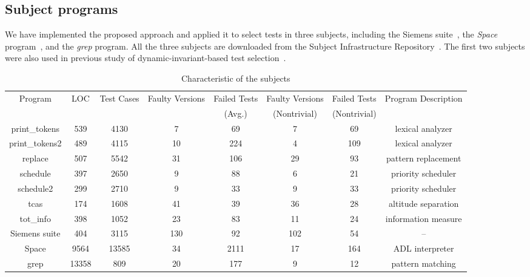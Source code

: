 \documentclass{sig-alternate}
\begin{document}
\subsection{Subject programs}

We have implemented the proposed approach and applied it to select
tests in three subjects, including the Siemens
suite~\cite{Hutchins94}, the {\it Space} program~\cite{Rothermel01},
and the {\it grep} program. All the three subjects are downloaded
from the Subject Infrastructure Repository~\cite{SIR}. The first two
subjects were also used in previous study of dynamic-invariant-based
test selection~\cite{Harder03}.



\begin{table}[t]
\caption{Characteristic of the subjects}\label{tab:subjects} \center
\begin{tabular}{|c|c|c|c|c|c|c|c|}
%

\hline  Program &   LOC &   Test Cases  &   Faulty Versions & Failed
Tests & Faulty Versions     &   Failed Tests
    &   Program Description \\
 & &  &  & (Avg.) & (Nontrivial) & (Nontrivial) & \\

\hline  print\_tokens   &   539 &   4130    &   7   &   69    &   7   &   69    &   lexical analyzer    \\
\hline  print\_tokens2  &   489 &   4115    &   10  &   224   &   4   &   109   &   lexical analyzer    \\
\hline  replace &   507 &   5542    &   31  &   106   &   29  &   93    &   pattern replacement \\
\hline  schedule    &   397 &   2650    &   9   &   88    &   6   &   21  &   priority scheduler  \\
\hline  schedule2   &   299 &   2710    &   9   &   33    &   9   &   33    &   priority scheduler  \\
\hline  tcas    &   174 &   1608    &   41  &   39    &   36  &   28    &   altitude separation \\
\hline  tot\_info &   398 &   1052    &   23  &   83    &   11  &   24    &   information measure \\
\hline  Siemens suite & 404 & 3115 & 130 & 92 & 102 & 54 & -- \\
\hline  Space   &   9564    &   13585   &   34  &   2111    &   17  &   164   &   ADL interpreter \\
\hline  grep    &   13358   &   809 &   20  &   177 &   9   &   12    &   pattern matching    \\

\hline
\end{tabular}
\end{table}
\end{document}
